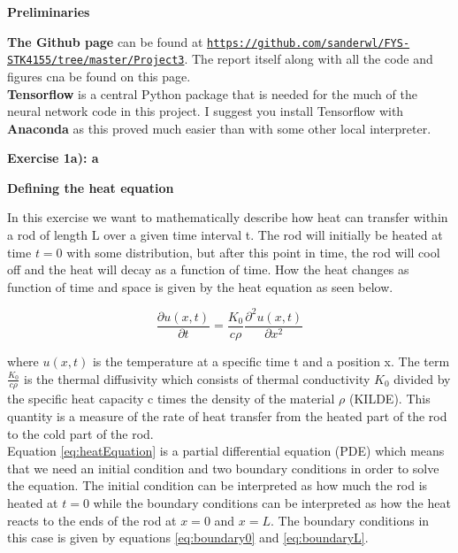 \documentclass[12pt,a4paper]{article}
\begin{document}
\newpage

\begin{center}
\Large{\textbf{Preliminaries}}
\end{center}

\noindent \textbf{The Github page} can be found at \href{{https://github.com/sanderwl/FYS-STK4155/tree/master/Project3}}{\nolinkurl{https://github.com/sanderwl/FYS-STK4155/tree/master/Project3}}. The report itself along with all the code and figures cna be found on this page.
\\
\textbf{Tensorflow} is a central Python package that is needed for the much of the neural network code in this project. I suggest you install Tensorflow with \textbf{Anaconda} as this proved much easier than with some other local interpreter.

\newpage

\begin{center}
\Large{\textbf{Exercise 1a): a}}
\end{center}

\begin{center}
\large{\textbf{Defining the heat equation}}
\end{center}

\noindent In this exercise we want to mathematically describe how heat can transfer within a rod of length L over a given time interval t. The rod will initially be heated at time $t = 0$ with some distribution, but after this point in time, the rod will cool off and the heat will decay as a function of time. How the heat changes as function of time and space is given by the heat equation as seen below.

\begin{equation}\label{eq:heatEquation}
\frac{\partial u(x,t)}{\partial t} = \frac{K_0}{c\rho} \frac{\partial^2 u(x,t)}{\partial x^2} 
\end{equation}

\noindent where $u(x,t)$ is the temperature at a specific time t and a position x. The term $\frac{K_0}{c\rho}$ is the thermal diffusivity which consists of thermal conductivity $K_0$ divided by the specific heat capacity c times the density of the material $\rho$ (KILDE). This quantity is a measure of the rate of heat transfer from the heated part of the rod to the cold part of the rod. 
\\
Equation \ref{eq:heatEquation} is a partial differential equation (PDE) which means that we need an initial condition and two boundary conditions in order to solve the equation. The initial condition can be interpreted as how much the rod is heated at $t = 0$ while the boundary conditions can be interpreted as how the heat reacts to the ends of the rod at $x = 0$ and $x = L$. The boundary conditions in this case is given by equations \ref{eq:boundary0} and \ref{eq:boundaryL}.
\end{document}
